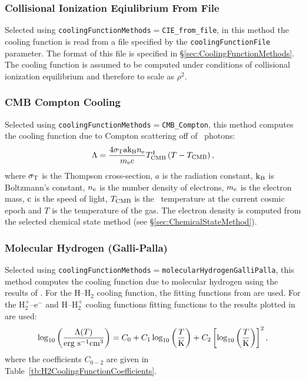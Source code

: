 \subsubsection{Collisional Ionization Eqiulibrium From File}

Selected using {\tt coolingFunctionMethods}$=${\tt CIE\_from\_file}, in this method the cooling function is read from a file specified by the {\tt coolingFunctionFile} parameter. The format of this file is specified in \S\ref{sec:CoolingFunctionMethods}. The cooling function is assumed to be computed under conditions of collisional ionization equilibrium and therefore to scale as $\rho^2$.

\subsubsection{CMB Compton Cooling}

Selected using {\tt coolingFunctionMethods}$=${\tt CMB\_Compton}, this method computes the cooling function due to Compton scattering off of \CMB\ photons:
\begin{equation}
\Lambda = {4 \sigma_{\rm T} {\rm a} {\rm k}_{\rm B} n_{\rm e } \over m_{\rm e} \clight} T_{\rm CMB}^4 \left( T - T_{\rm CMB} \right),
\end{equation}
where $\sigma_{\rm T}$ is the Thompson cross-section, $a$ is the radiation constant, ${\rm k}_{\rm B}$ is Boltzmann's constant, $n_{\rm e}$ is the number density of electrons, $m_{\rm e}$ is the electron mass, $\clight$ is the speed of light, $T_{\rm CMB}$ is the \CMB\ temperature at the current cosmic epoch and $T$ is the temperature of the gas. The electron density is computed from the selected chemical state method (see \S\ref{sec:ChemicalStateMethod}).

\subsubsection{Molecular Hydrogen (Galli-Palla)}

Selected using {\tt coolingFunctionMethods}$=${\tt molecularHydrogenGalliPalla}, this method computes the cooling function due to molecular hydrogen using the results of \cite{galli_chemistry_1998}. For the H--H$_2$ cooling function, the fitting functions from \cite{galli_chemistry_1998} are used. For the H$_2^+$--e$^-$ and H--H$_2^+$ cooling functions fitting functions to the results plotted in  \cite{suchkov_cooling_1978} are used:
\begin{equation}
\log_{10}\left({\Lambda(T) \over \hbox{erg s}^{-1} \hbox{cm}^3}\right) = C_0 + C_1 \log_{10} \left({T\over\hbox{K}}\right) + C_2 \left[\log_{10} \left({T\over\hbox{K}}\right)\right]^2,
\label{eq:H2CoolingFunction}
\end{equation}
where the coefficients $C_{0-2}$ are given in Table~\ref{tb:H2CoolingFunctionCoefficients}.

